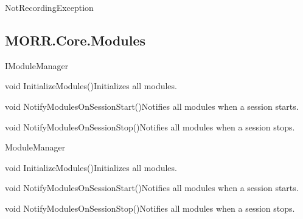 \begin{class}{NotRecordingException}


\end{class}

\subsection*{MORR.Core.Modules}

\begin{interface}{IModuleManager}



    \begin{methods}
        \begin{method}{void InitializeModules()}{Initializes all modules.}      
        \end{method}
        \begin{method}{void NotifyModulesOnSessionStart()}{Notifies all modules when a session starts.}
        \end{method}
        \begin{method}{void NotifyModulesOnSessionStop()}{Notifies all modules when a session stops.}
        \end{method}
    \end{methods}
\end{interface}

\begin{class}{ModuleManager}



    \begin{methods}
        \begin{method}{void InitializeModules()}{Initializes all modules.}      
        \end{method}
        \begin{method}{void NotifyModulesOnSessionStart()}{Notifies all modules when a session starts.}
        \end{method}
        \begin{method}{void NotifyModulesOnSessionStop()}{Notifies all modules when a session stops.}
        \end{method}
    \end{methods}
\end{class}

